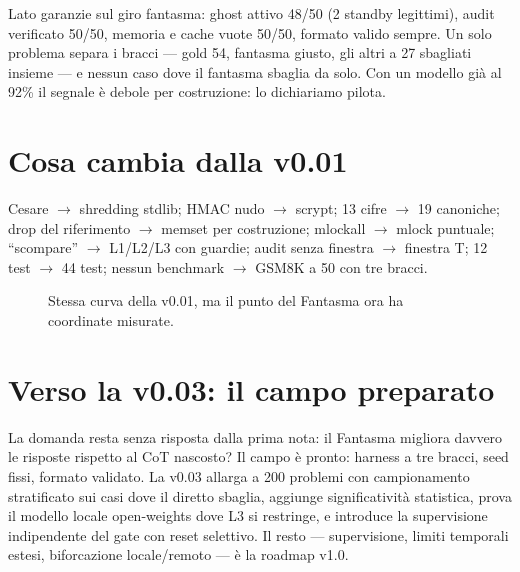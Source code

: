 \documentclass[11pt,a4paper]{article}
\begin{document}
Lato garanzie sul giro fantasma: ghost attivo 48/50 (2 standby legittimi),
audit verificato 50/50, memoria e cache vuote 50/50, formato valido sempre.
Un solo problema separa i bracci --- gold 54, fantasma giusto, gli altri a 27
sbagliati insieme --- e nessun caso dove il fantasma sbaglia da solo. Con un
modello gi\`a al 92\% il segnale \`e debole per costruzione: lo dichiariamo pilota.

\section{Cosa cambia dalla v0.01}
Cesare $\to$ shredding stdlib; HMAC nudo $\to$ scrypt; 13 cifre $\to$ 19 canoniche;
drop del riferimento $\to$ memset per costruzione; mlockall $\to$ mlock puntuale;
``scompare'' $\to$ L1/L2/L3 con guardie; audit senza finestra $\to$ finestra T;
12 test $\to$ 44 test; nessun benchmark $\to$ GSM8K a 50 con tre bracci.

\begin{figure}[h]
\centering
{}
\caption{Stessa curva della v0.01, ma il punto del Fantasma ora ha coordinate misurate.}
\end{figure}

\section{Verso la v0.03: il campo preparato}
La domanda resta senza risposta dalla prima nota: il Fantasma migliora davvero
le risposte rispetto al CoT nascosto? Il campo \`e pronto: harness a tre bracci,
seed fissi, formato validato. La v0.03 allarga a 200 problemi con campionamento
stratificato sui casi dove il diretto sbaglia, aggiunge significativit\`a statistica,
prova il modello locale open-weights dove L3 si restringe, e introduce la
supervisione indipendente del gate con reset selettivo. Il resto --- supervisione,
limiti temporali estesi, biforcazione locale/remoto --- \`e la roadmap v1.0.
\end{document}
